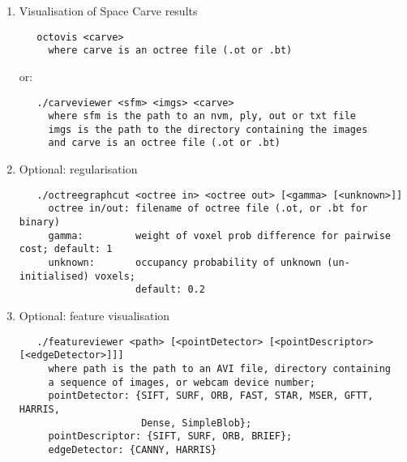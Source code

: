 \begin{enumerate}
\item Visualisation of Space Carve results

   \begin{verbatim}
   octovis <carve>
     where carve is an octree file (.ot or .bt)
   \end{verbatim}

   or:

   \begin{verbatim}
   ./carveviewer <sfm> <imgs> <carve>
     where sfm is the path to an nvm, ply, out or txt file
     imgs is the path to the directory containing the images
     and carve is an octree file (.ot or .bt)
   \end{verbatim}
   

\item Optional: regularisation

   \begin{verbatim}
   ./octreegraphcut <octree in> <octree out> [<gamma> [<unknown>]]
     octree in/out: filename of octree file (.ot, or .bt for binary)
     gamma:         weight of voxel prob difference for pairwise cost; default: 1
     unknown:       occupancy probability of unknown (un-initialised) voxels;
                    default: 0.2
   \end{verbatim}


\item Optional: feature visualisation

   \begin{verbatim}
   ./featureviewer <path> [<pointDetector> [<pointDescriptor> [<edgeDetector>]]]
     where path is the path to an AVI file, directory containing
     a sequence of images, or webcam device number;
     pointDetector: {SIFT, SURF, ORB, FAST, STAR, MSER, GFTT, HARRIS,
                     Dense, SimpleBlob};
     pointDescriptor: {SIFT, SURF, ORB, BRIEF};
     edgeDetector: {CANNY, HARRIS}
   \end{verbatim}

\end{enumerate}
